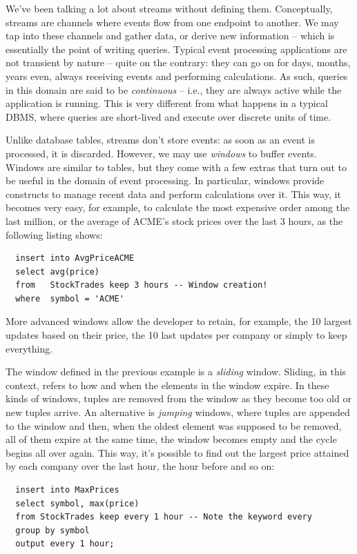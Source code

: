 We've been talking a lot about streams without defining
them. Conceptually, streams are channels where events flow from one
endpoint to another. We may tap into these channels and gather data,
or derive new information -- which is essentially the point of writing
queries. Typical event processing applications are not transient by
nature -- quite on the contrary: they can go on for days, months,
years even, always receiving events and performing calculations. As
such, queries in this domain are said to be \emph{continuous} -- i.e.,
they are always active while the application is running. This is very
different from what happens in a typical DBMS, where queries are
short-lived and execute over discrete units of time.

Unlike database tables, streams don't store events: as soon as an
event is processed, it is discarded. However, we may use
\emph{windows} to buffer events. Windows are similar to tables, but
they come with a few extras that turn out to be useful in the domain
of event processing. In particular, windows provide constructs to
manage recent data and perform calculations over it. This way, it
becomes very easy, for example, to calculate the most expensive order
among the last million, or the average of ACME's stock prices over the
last 3 hours, as the following listing shows:

\begin{lstlisting}
  insert into AvgPriceACME
  select avg(price)
  from   StockTrades keep 3 hours -- Window creation!
  where  symbol = 'ACME'
\end{lstlisting}

More advanced windows allow the developer to retain, for example, the
10 largest updates based on their price, the 10 last updates per
company or simply to keep everything.

The window defined in the previous example is a \emph{sliding}
window. Sliding, in this context, refers to how and when the elements
in the window expire. In these kinds of windows, tuples are removed
from the window as they become too old or new tuples arrive. An
alternative is \emph{jumping} windows, where tuples are appended to
the window and then, when the oldest element was supposed to be
removed, all of them expire at the same time, the window becomes empty
and the cycle begins all over again. This way, it's possible to find
out the largest price attained by each company over the last hour, the
hour before and so on:

\begin{lstlisting}
  insert into MaxPrices
  select symbol, max(price)
  from StockTrades keep every 1 hour -- Note the keyword every
  group by symbol
  output every 1 hour;
\end{lstlisting}

